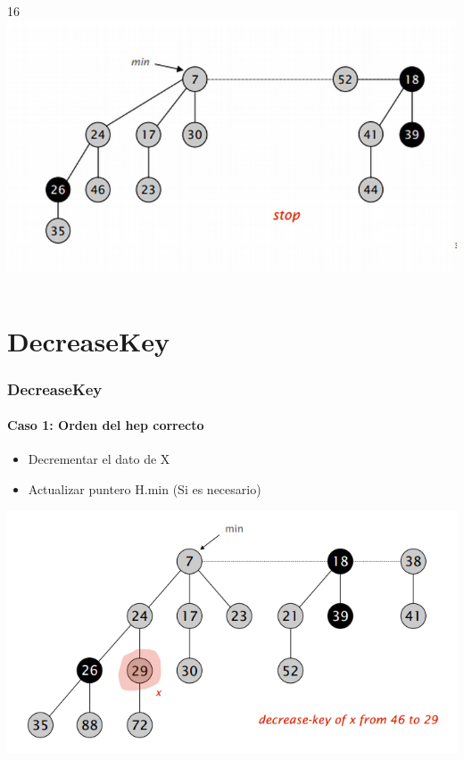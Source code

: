 \documentclass{beamer}
\begin{document}
\begin{frame}
\begin{columns}[t]
    16
    \includegraphics[width =0.9 \textwidth]{imagenes/delete16.png}

   \end{columns}
  \end{frame}

\section{DecreaseKey}
\begin{frame}
  \frametitle{DecreaseKey}
  \framesubtitle{Caso 1: Orden del hep correcto}
  \begin{itemize}
    \item Decrementar el dato de X
    \item Actualizar puntero H.min (Si es necesario)

  \end{itemize}
  
   \includegraphics[width =1 \textwidth]{img/decrease/01.png}
\end{frame}
\end{document}

